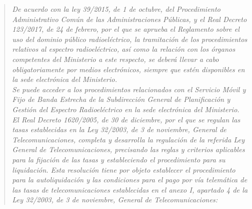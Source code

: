 \begin{quote}
\itshape
De acuerdo con la ley 39/2015, de 1 de octubre, del Procedimiento Administrativo Común de las Administraciones Públicas, y el Real Decreto 123/2017, de 24 de febrero, por el que se aprueba el Reglamento sobre el uso del dominio público radioeléctrico, la tramitación de los procedimientos relativos al espectro radioeléctrico, así como la relación con los órganos competentes del Ministerio a este respecto, se deberá llevar a cabo obligatoriamente por medios electrónicos, siempre que estén disponibles en la sede electrónica del Ministerio.\\

Se puede acceder a los procedimientos relacionados con el Servicio Móvil y Fijo de Banda Estrecha de la Subdirección General de Planificación y Gestión del Espectro Radioeléctrico en la sede electrónica del Ministerio.\\

El Real Decreto 1620/2005, de 30 de diciembre, por el que se regulan las tasas establecidas en la Ley 32/2003, de 3 de noviembre, General de Telecomunicaciones, completa y desarrolla la regulación de la referida Ley General de Telecomunicaciones, precisando las reglas y criterios aplicables para la fijación de las tasas y estableciendo el procedimiento para su liquidación. Esta resolución tiene por objeto establecer el procedimiento para la autoliquidación y las condiciones para el pago por vía telemática de las tasas de telecomunicaciones establecidas en el anexo I, apartado 4 de la Ley 32/2003, de 3 de noviembre, General de Telecomunicaciones:
\end{quote}


